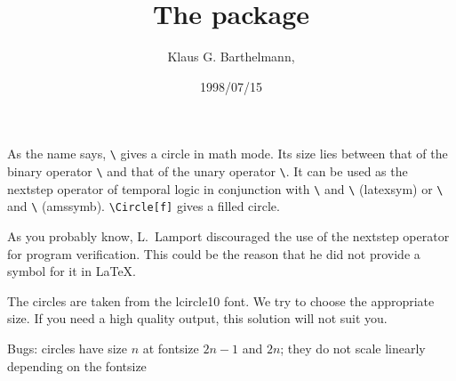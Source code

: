 \documentclass[DIV=9, parskip=half, pagesize=auto]{scrartcl}
\title{The \pkg{circle} package}
\author{Klaus G. Barthelmann, \mail{barthel@informatik.uni-mainz.de}}
\date{1998/07/15}
\makeatletter
\newcommand*{\pkg}[1]{\textsf{#1}}
\newcommand*{\cs}[1]{\texttt{\textbackslash#1}}
\newcommand*{\cmd}[1]{\cs{\expandafter\@gobble\string#1}}
\makeatother
\begin{document}
\maketitle

As the name says, \cmd{\Circle} gives a circle in math mode. Its size lies between
that of the binary operator \cmd{\circ} and that of the unary operator \cmd{\bigcirc}.
It can be used as the nextstep operator of temporal logic in conjunction with
\cmd{\Box} and \cmd{\Diamond} (\pkg{latexsym}) or \cmd{\square} and \cmd{\lozenge} (\pkg{amssymb}). \verb+\Circle[f]+
gives a filled circle.

As you probably know, L.~Lamport discouraged the use of the nextstep
operator for program verification. This could be the reason that he did not
provide a symbol for it in \LaTeX.

The circles are taken from the \pkg{lcircle10} font. We try to choose the
appropriate size. If you need a high quality output, this solution will not
suit you.

Bugs: circles have size $n$ at fontsize $2n-1$ and $2n$; they do not scale linearly
depending on the fontsize
\end{document}

